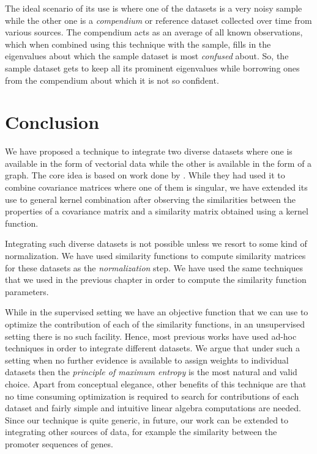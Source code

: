 The ideal scenario of its use is where one of the datasets is a very noisy sample while the other one is a \textit{compendium} or reference dataset collected over time from various sources. The compendium acts as an average of all known observations, which when combined using this technique with the sample, fills in the eigenvalues about which the sample dataset is most \textit{confused} about. So, the sample dataset gets to keep all its prominent eigenvalues while borrowing ones from the compendium about which it is not so confident. 


\section{Conclusion}

We have proposed a technique to integrate two diverse datasets where one is available in the form of vectorial data while the other is available in the form of a graph. The core idea is based on work done by \citet{thomaz2004covariance}. While they had used it to combine covariance matrices where one of them is singular, we have extended its use to general kernel combination after observing the similarities between the properties of a covariance matrix and a similarity matrix obtained using a kernel function. 

Integrating such diverse datasets is not possible unless we resort to some kind of normalization. We have used similarity functions to compute similarity matrices for these datasets as the \textit{normalization} step. We have used the same techniques that we used in the previous chapter in order to compute the similarity function parameters.
 
While in the supervised setting we have an objective function that we can use to optimize the contribution of each of the similarity functions, in an unsupervised setting there is no such facility. Hence, most previous works have used ad-hoc techniques in order to integrate different datasets. We argue that under such a setting when no further evidence is available to assign weights to individual datasets then the \textit{principle of maximum entropy} is the most natural and valid choice. Apart from conceptual elegance, other benefits of this technique are that no time consuming optimization is required to search for contributions of each dataset and fairly simple and intuitive linear algebra computations are needed. Since our technique is quite generic, in future, our work can be extended to integrating other sources of data, for example  the similarity between the promoter sequences of genes.  

